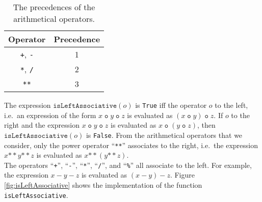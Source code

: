 \begin{table}[!ht]
  \centering
    \begin{tabular}{|c|c|}
    \hline
      Operator & Precedence \\
    \hline\hline
      \texttt{+}, \texttt{-} & 1 \\
    \hline
      \texttt{*}, \texttt{/} & 2 \\
    \hline
      \texttt{**}           & 3 \\
    \hline
    \end{tabular}
  \caption{The precedences of the arithmetical operators.}
  \label{tab:precedence}
\end{table}

The expression $\texttt{isLeftAssociative}(o)$ is \texttt{True} iff the operator $o$ 
 to the left, i.e.~an expression of the form $x \;\mathtt{o}\; y \;\mathtt{o}\; z$
is evaluated as  $(x \;\mathtt{o}\; y) \;\mathtt{o}\; z$.  If $o$  to the 
right and the expression  $x \;\mathtt{o}\; y \;\mathtt{o}\; z$
is evaluated as  $x \;\mathtt{o}\; (y \;\mathtt{o}\; z)$, then $\texttt{isLeftAssociative}(o)$
is \texttt{False}.  From the arithmetical operators that we consider, only the power operator ``\texttt{**}'' 
associates to the right, i.e.~the expression
\\[0.2cm]
\hspace*{1.3cm}
$x \mathtt{**} y \mathtt{**} z$ \quad is evaluated as \quad $x \mathtt{**} (y \mathtt{**} z)$.
\\[0.2cm]
The operators 
``\texttt{+}'', ``\texttt{-}'', ``\texttt{*}'', ``\texttt{/}'', and ``\texttt{\%}'' 
all associate to the left.  For example, the expression
$x - y - z$ is evaluated as $(x - y) - z$.
Figure \ref{fig:isLeftAssociative} shows the implementation of the function \texttt{isLeftAssociative}.

